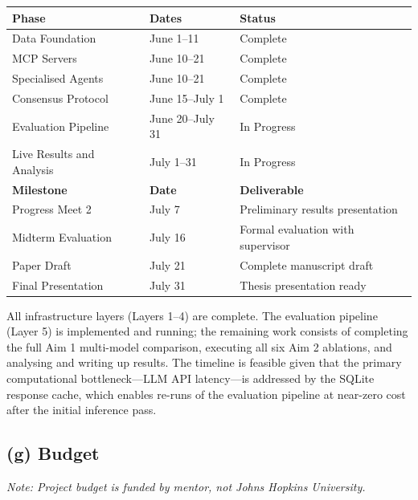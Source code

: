 \documentclass[11pt,letterpaper]{article}
\begin{document}
\begin{center}
\begin{tabular}{lll}
\toprule
\textbf{Phase} & \textbf{Dates} & \textbf{Status} \\
\midrule
Data Foundation & June 1--11 & Complete \\
MCP Servers & June 10--21 & Complete \\
Specialised Agents & June 10--21 & Complete \\
Consensus Protocol & June 15--July 1 & Complete \\
Evaluation Pipeline & June 20--July 31 & In Progress \\
Live Results and Analysis & July 1--31 & In Progress \\
\midrule
\textbf{Milestone} & \textbf{Date} & \textbf{Deliverable} \\
\midrule
Progress Meet 2 & July 7 & Preliminary results presentation \\
Midterm Evaluation & July 16 & Formal evaluation with supervisor \\
Paper Draft & July 21 & Complete manuscript draft \\
Final Presentation & July 31 & Thesis presentation ready \\
\bottomrule
\end{tabular}
\end{center}

\vspace{1em}

All infrastructure layers (Layers 1--4) are complete. The evaluation pipeline (Layer 5) is
implemented and running; the remaining work consists of completing the full Aim 1 multi-model
comparison, executing all six Aim 2 ablations, and analysing and writing up results. The timeline
is feasible given that the primary computational bottleneck---LLM API latency---is addressed
by the SQLite response cache, which enables re-runs of the evaluation pipeline at near-zero
cost after the initial inference pass.

\subsection{(g) Budget}
\textit{Note: Project budget is funded by mentor, not Johns Hopkins University.}
\end{document}
